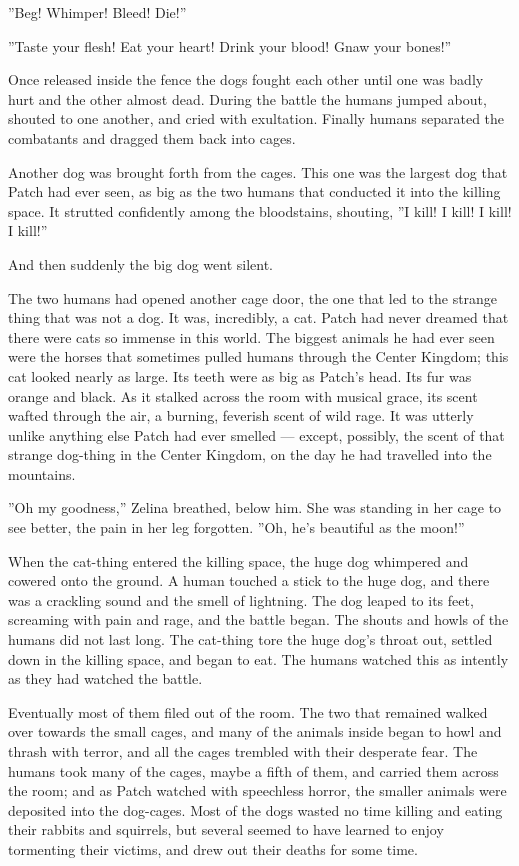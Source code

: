 \documentclass[12pt]{book}
\begin{document}
''Beg! Whimper! Bleed! Die!''

''Taste your flesh! Eat your heart! Drink your blood! Gnaw your
bones!''

Once released inside the fence the dogs fought each other until one
was badly hurt and the other almost dead. During the battle the humans
jumped about, shouted to one another, and cried with
exultation. Finally humans separated the combatants and dragged them
back into cages.

Another dog was brought forth from the cages. This one was the largest
dog that Patch had ever seen, as big as the two humans that conducted
it into the killing space. It strutted confidently among the
bloodstains, shouting, ''I kill! I kill! I kill! I kill!''

And then suddenly the big dog went silent.

The two humans had opened another cage door, the one that led to the
strange thing that was not a dog. It was, incredibly, a cat. Patch had
never dreamed that there were cats so immense in this world. The
biggest animals he had ever seen were the horses that sometimes pulled
humans through the Center Kingdom; this cat looked nearly as
large. Its teeth were as big as Patch's head. Its fur was orange and
black. As it stalked across the room with musical grace, its scent
wafted through the air, a burning, feverish scent of wild rage. It was
utterly unlike anything else Patch had ever smelled --- except,
possibly, the scent of that strange dog-thing in the Center Kingdom,
on the day he had travelled into the mountains.

''Oh my goodness,'' Zelina breathed, below him. She was standing in
her cage to see better, the pain in her leg forgotten. ''Oh, he's
beautiful as the moon!''

When the cat-thing entered the killing space, the huge dog whimpered
and cowered onto the ground. A human touched a stick to the huge dog,
and there was a crackling sound and the smell of lightning. The dog
leaped to its feet, screaming with pain and rage, and the battle
began. The shouts and howls of the humans did not last long. The
cat-thing tore the huge dog's throat out, settled down in the killing
space, and began to eat. The humans watched this as intently as they
had watched the battle.

Eventually most of them filed out of the room. The two that remained
walked over towards the small cages, and many of the animals inside
began to howl and thrash with terror, and all the cages trembled with
their desperate fear. The humans took many of the cages, maybe a fifth
of them, and carried them across the room; and as Patch watched with
speechless horror, the smaller animals were deposited into the
dog-cages. Most of the dogs wasted no time killing and eating their
rabbits and squirrels, but several seemed to have learned to enjoy
tormenting their victims, and drew out their deaths for some time.
\end{document}
